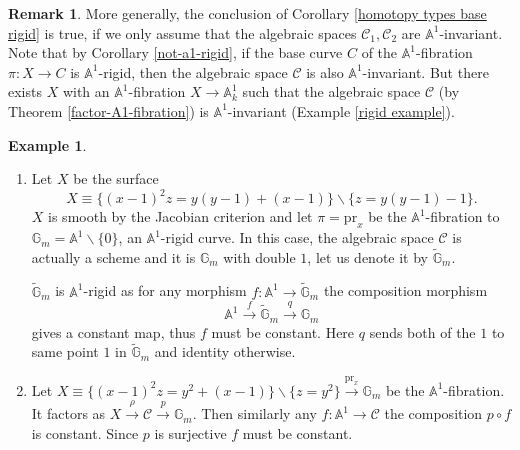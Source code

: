 \documentclass[11pt, reqno]{amsart}
\theoremstyle{plain}
\theoremstyle{definition}
\newtheorem{remark}[thm]{Remark}
\newtheorem{example}[thm]{Example}
\newcommand{\pr}{\mathrm{pr}}%
\renewcommand{\tilde}{\widetilde}
\newcommand{\sC}{{\mathcal C}}
\newcommand{\A}{{\mathbb A}}
\newcommand{\G}{{\mathbb G}}
\begin{document}
\begin{remark}
More generally, the conclusion of Corollary \ref{homotopy types base rigid} is true, if we only assume that the algebraic spaces $\sC_1, \sC_2$ are $\A^1$-invariant. Note that by Corollary \ref{not-a1-rigid}, if the base curve $C$ of the $\A^1$-fibration $\pi:X \to C$ is $\A^1$-rigid, then the algebraic space $\sC$ is also $\A^1$-invariant. But there exists $X$ with an $\A^1$-fibration $X \to \A^1_k$ such that the algebraic space $\sC$ (by Theorem \ref{factor-A1-fibration}) is $\A^1$-invariant (Example \ref{rigid example}).
\end{remark}
		\begin{example}
			\begin{enumerate}
				\item Let $X$ be the surface
                $$X\equiv\{(x-1)^2z=y(y-1)+(x-1)\}\backslash \{z=y(y-1)-1\}.$$
                $X$ is smooth by the Jacobian criterion and let $\pi=\pr_x$ be the $\A^1$-fibration to $\G_m=\A^1\backslash\{0\}$, an $\A^1$-rigid curve. In this case, the algebraic space $\sC$ is actually a scheme and it is $\G_m$ with double $1$, let us denote it by $\tilde{\G}_m$.\par $\tilde{\G}_m$ is $\A^1$-rigid as for any morphism $f:\A^1\to\tilde{\G}_m$ the composition morphism $$\A^1\xrightarrow{f}\tilde{\G}_m\xrightarrow{q}\G_m$$gives a constant map, thus $f$ must be constant. Here $q$ sends both of the $1$ to same point $1$ in $\tilde{\G}_m$ and identity otherwise. 
				\item Let $X\equiv\{(x-1)^2z=y^2+(x-1)\}\backslash \{z=y^2\} \xrightarrow{\pr_x}\G_m$ be the $\A^1$-fibration. It factors as $X\xrightarrow{\rho}\sC\xrightarrow{p}\G_m$. Then similarly any $f:\A^1\to \sC$ the composition $p \circ f$ is constant. Since $p$ is surjective $f$ must be constant.
			\end{enumerate}
		\end{example}
		
\end{document}
